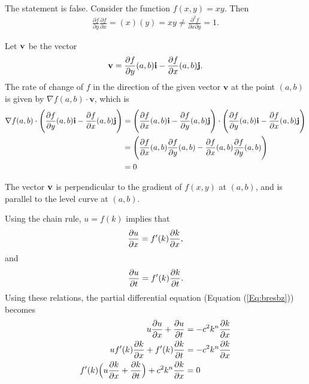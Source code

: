 \item  {}\\ 
The statement is false. Consider the function $f(x,y)=xy$. Then
\begin{align*}
   \frac{\partial f}{\partial y}\frac{\partial f}{\partial x} = (x)(y) = xy \ne \frac{\partial^2 f}{\partial x \partial y} = 1.
\end{align*}
\item  {}
\BEN
\item Let $\mathbf{v}$ be the vector
\begin{align*}
 \mathbf{v} =  \frac{\partial f}{\partial y}(a,b)\mathbf{i}-\frac{\partial f}{\partial x}(a,b)\mathbf{j}.
\end{align*}
The rate of change of $f$ in the direction of the given vector $\mathbf{v}$ at the point $(a,b)$ is given by $\nabla f(a,b) \cdot \mathbf{v}$, which is
\begin{align*}
   \nabla f(a,b) \cdot \Bigg( \frac{\partial f}{\partial y}(a,b)\mathbf{i}-\frac{\partial f}{\partial x}(a,b)\mathbf{j}\Bigg)
   &=  \Bigg( \frac{\partial f}{\partial x} (a,b)\mathbf{i} - \frac{\partial f}{\partial y}(a,b)\mathbf{j}\Bigg) \cdot \Bigg( \frac{\partial f}{\partial y} (a,b)\mathbf{i}- \frac{\partial f}{\partial x}(a,b)\mathbf{j}\Bigg) \\
   &=  \Bigg( \frac{\partial f}{\partial x}(a,b) \frac{\partial f}{\partial y}(a,b)-\frac{\partial f}{\partial x}(a,b) \frac{\partial f}{\partial y}(a,b)\Bigg)\\
   &= 0
\end{align*}
\item The vector $\mathbf{v}$ is perpendicular to the gradient of $f(x,y)$ at $(a,b)$, and is parallel to the level curve at $(a,b)$. 
\EEN
\item  {}
\BEN
\item Using the chain rule, $u=f(k)$ implies that 
\begin{align*}
   \frac{\partial u}{\partial x } =f'(k)\frac{\partial k}{\partial x } ,
\end{align*}
and
\begin{align*}
   \frac{\partial u}{\partial t} = f'(k)\frac{\partial k}{\partial t } .
\end{align*}
Using these relations, the partial differential equation (Equation (\ref{Eq:bresbz})) becomes
\begin{align*}
  u\frac{\partial u}{\partial x}+\frac{\partial u}{\partial t}&=-c^2k^n\frac{\partial k}{\partial x} \\
  uf'(k)\frac{\partial k}{\partial x }+f'(k)\frac{\partial k}{\partial t } &=-c^2k^n\frac{\partial k}{\partial x} \\
  f'(k)\Big(u\frac{\partial k}{\partial x }+\frac{\partial k}{\partial t }\Big) + c^2k^n\frac{\partial k}{\partial x} &=0\\
\end{align*}
